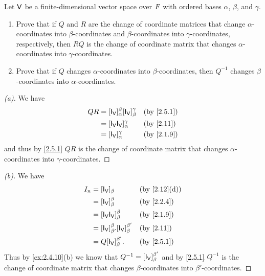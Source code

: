 \begin{ex}\label{ex:2.5.11}
  Let \(\mathsf{V}\) be a finite-dimensional vector space over \(\mathit{F}\) with ordered bases \(\alpha\), \(\beta\), and \(\gamma\).
  \begin{enumerate}
    \item Prove that if \(Q\) and \(R\) are the change of coordinate matrices that change \(\alpha\)-coordinates into \(\beta\)-coordinates and \(\beta\)-coordinates into \(\gamma\)-coordinates, respectively, then \(RQ\) is the change of coordinate matrix that changes \(\alpha\)-coordinates into \(\gamma\)-coordinates.
    \item Prove that if \(Q\) changes \(\alpha\)-coordinates into \(\beta\)-coordinates, then \(Q^{-1}\) changes \(\beta\)-coordinates into \(\alpha\)-coordinates.
  \end{enumerate}
\end{ex}

\begin{proof}[(a)]
  We have
  \begin{align*}
    QR & = [\IT[\V]]_{\alpha}^{\beta} [\IT[\V]]_{\beta}^{\gamma} &  & \text{(by \cref{2.5.1})} \\
       & = [\IT[\V] \IT[\V]]_{\alpha}^{\gamma}                   &  & \text{(by \cref{2.11})}  \\
       & = [\IT[\V]]_{\alpha}^{\gamma}                           &  & \text{(by \cref{2.1.9})}
  \end{align*}
  and thus by \cref{2.5.1} \(QR\) is the change of coordinate matrix that changes \(\alpha\)-coordinates into \(\gamma\)-coordinates.
\end{proof}

\begin{proof}[(b)]
  We have
  \begin{align*}
    I_n & = [\IT[\V]]_{\beta}                                     &  & \text{(by \cref{2.12}(d))} \\
        & = [\IT[\V]]_{\beta}^{\beta}                             &  & \text{(by \cref{2.2.4})}   \\
        & = [\IT[\V] \IT[\V]]_{\beta}^{\beta}                     &  & \text{(by \cref{2.1.9})}   \\
        & = [\IT[\V]]_{\beta'}^{\beta} [\IT[\V]]_{\beta}^{\beta'} &  & \text{(by \cref{2.11})}    \\
        & = Q [\IT[\V]]_{\beta}^{\beta'}.                         &  & \text{(by \cref{2.5.1})}
  \end{align*}
  Thus by \cref{ex:2.4.10}(b) we know that \(Q^{-1} = [\IT[\V]]_{\beta}^{\beta'}\) and by \cref{2.5.1} \(Q^{-1}\) is the change of coordinate matrix that changes \(\beta\)-coordinates into \(\beta'\)-coordinates.
\end{proof}
